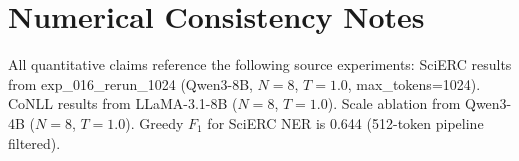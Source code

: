 \documentclass[11pt]{article}
\begin{document}



\appendix
\section{Numerical Consistency Notes}

All quantitative claims reference the following source experiments: SciERC results from exp\_016\_rerun\_1024 (Qwen3-8B, $N=8$, $T=1.0$, max\_tokens=1024). CoNLL results from LLaMA-3.1-8B ($N=8$, $T=1.0$). Scale ablation from Qwen3-4B ($N=8$, $T=1.0$). Greedy $F_1$ for SciERC NER is 0.644 (512-token pipeline filtered).
\end{document}
